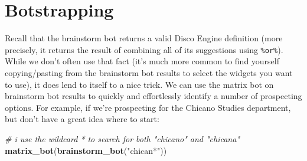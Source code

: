 \documentclass[]{book}
\newenvironment{Shaded}{\begin{snugshade}}{\end{snugshade}}
\newcommand{\CommentTok}[1]{\textcolor[rgb]{0.56,0.35,0.01}{\textit{#1}}}
\newcommand{\KeywordTok}[1]{\textcolor[rgb]{0.13,0.29,0.53}{\textbf{#1}}}
\newcommand{\NormalTok}[1]{#1}
\newcommand{\StringTok}[1]{\textcolor[rgb]{0.31,0.60,0.02}{#1}}
\begin{document}
\hypertarget{botstrapping}{%
\section{Botstrapping}\label{botstrapping}}

Recall that the brainstorm bot returns a valid Disco Engine definition (more precisely, it returns the result of combining all of its suggestions using \texttt{\%or\%}). While we don't often use that fact (it's much more common to find yourself copying/pasting from the brainstorm bot results to select the widgets you want to use), it does lend to itself to a nice trick. We can use the matrix bot on brainstorm bot results to quickly and effortlessly identify a number of prospecting options. For example, if we're prospecting for the Chicano Studies department, but don't have a great idea where to start:

\begin{Shaded}
\begin{Highlighting}[]
\CommentTok{# i use the wildcard * to search for both "chicano" and "chicana"}
\KeywordTok{matrix_bot}\NormalTok{(}\KeywordTok{brainstorm_bot}\NormalTok{(}\StringTok{"chican*"}\NormalTok{))}
\end{Highlighting}
\end{Shaded}
\end{document}
